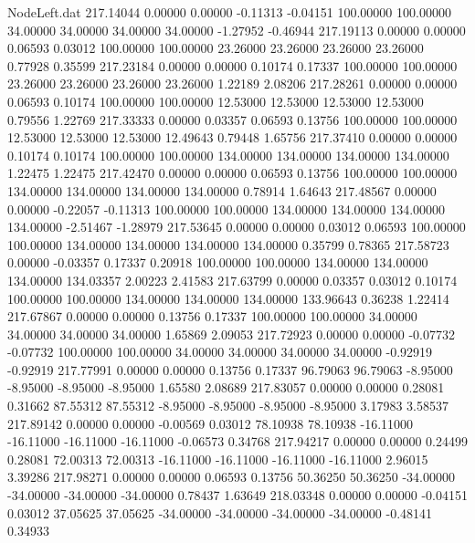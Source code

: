 \begin{filecontents}{NodeLeft.dat}
 217.14044    0.00000    0.00000    -0.11313   -0.04151  100.00000  100.00000   34.00000   34.00000   34.00000   34.00000   -1.27952   -0.46944
 217.19113    0.00000    0.00000     0.06593    0.03012  100.00000  100.00000   23.26000   23.26000   23.26000   23.26000    0.77928    0.35599
 217.23184    0.00000    0.00000     0.10174    0.17337  100.00000  100.00000   23.26000   23.26000   23.26000   23.26000    1.22189    2.08206
 217.28261    0.00000    0.00000     0.06593    0.10174  100.00000  100.00000   12.53000   12.53000   12.53000   12.53000    0.79556    1.22769
 217.33333    0.00000    0.03357     0.06593    0.13756  100.00000  100.00000   12.53000   12.53000   12.53000   12.49643    0.79448    1.65756
 217.37410    0.00000    0.00000     0.10174    0.10174  100.00000  100.00000  134.00000  134.00000  134.00000  134.00000    1.22475    1.22475
 217.42470    0.00000    0.00000     0.06593    0.13756  100.00000  100.00000  134.00000  134.00000  134.00000  134.00000    0.78914    1.64643
 217.48567    0.00000    0.00000    -0.22057   -0.11313  100.00000  100.00000  134.00000  134.00000  134.00000  134.00000   -2.51467   -1.28979
 217.53645    0.00000    0.00000     0.03012    0.06593  100.00000  100.00000  134.00000  134.00000  134.00000  134.00000    0.35799    0.78365
 217.58723    0.00000   -0.03357     0.17337    0.20918  100.00000  100.00000  134.00000  134.00000  134.00000  134.03357    2.00223    2.41583
 217.63799    0.00000    0.03357     0.03012    0.10174  100.00000  100.00000  134.00000  134.00000  134.00000  133.96643    0.36238    1.22414
 217.67867    0.00000    0.00000     0.13756    0.17337  100.00000  100.00000   34.00000   34.00000   34.00000   34.00000    1.65869    2.09053
 217.72923    0.00000    0.00000    -0.07732   -0.07732  100.00000  100.00000   34.00000   34.00000   34.00000   34.00000   -0.92919   -0.92919
 217.77991    0.00000    0.00000     0.13756    0.17337   96.79063   96.79063   -8.95000   -8.95000   -8.95000   -8.95000    1.65580    2.08689
 217.83057    0.00000    0.00000     0.28081    0.31662   87.55312   87.55312   -8.95000   -8.95000   -8.95000   -8.95000    3.17983    3.58537
 217.89142    0.00000    0.00000    -0.00569    0.03012   78.10938   78.10938  -16.11000  -16.11000  -16.11000  -16.11000   -0.06573    0.34768
 217.94217    0.00000    0.00000     0.24499    0.28081   72.00313   72.00313  -16.11000  -16.11000  -16.11000  -16.11000    2.96015    3.39286
 217.98271    0.00000    0.00000     0.06593    0.13756   50.36250   50.36250  -34.00000  -34.00000  -34.00000  -34.00000    0.78437    1.63649
 218.03348    0.00000    0.00000    -0.04151    0.03012   37.05625   37.05625  -34.00000  -34.00000  -34.00000  -34.00000   -0.48141    0.34933

\end{filecontents}
